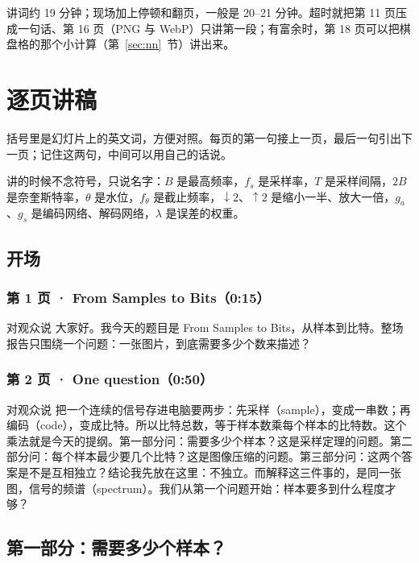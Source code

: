 讲词约 19 分钟；现场加上停顿和翻页，一般是 20--21 分钟。超时就把第 11 页压成一句话、第 16 页（PNG 与 WebP）只讲第一段；有富余时，第 18 页可以把棋盘格的那个小计算（第~\ref{sec:nn}~节）讲出来。

\section{逐页讲稿}\label{sec:script}

括号里是幻灯片上的英文词，方便对照。每页的第一句接上一页，最后一句引出下一页；记住这两句，中间可以用自己的话说。

讲的时候不念符号，只说名字：$B$ 是最高频率，$f_s$ 是采样率，$T$ 是采样间隔，$2B$ 是奈奎斯特率，$\theta$ 是水位，$f_\theta$ 是截止频率，$\downarrow2$、$\uparrow2$ 是缩小一半、放大一倍，$g_a$、$g_s$ 是编码网络、解码网络，$\lambda$ 是误差的权重。

\subsection*{开场}

\subsubsection*{第 1 页 · From Samples to Bits（0:15）}
\begin{exampleblock}{对观众说}
大家好。我今天的题目是 From Samples to Bits，从样本到比特。整场报告只围绕一个问题：一张图片，到底需要多少个数来描述？
\end{exampleblock}

\subsubsection*{第 2 页 · One question（0:50）}
\begin{exampleblock}{对观众说}
把一个连续的信号存进电脑要两步：先采样（sample），变成一串数；再编码（code），变成比特。所以比特总数，等于样本数乘每个样本的比特数。这个乘法就是今天的提纲。第一部分问：需要多少个样本？这是采样定理的问题。第二部分问：每个样本最少要几个比特？这是图像压缩的问题。第三部分问：这两个答案是不是互相独立？结论我先放在这里：不独立。而解释这三件事的，是同一张图，信号的频谱（spectrum）。我们从第一个问题开始：样本要多到什么程度才够？
\end{exampleblock}

\subsection*{第一部分：需要多少个样本？}

